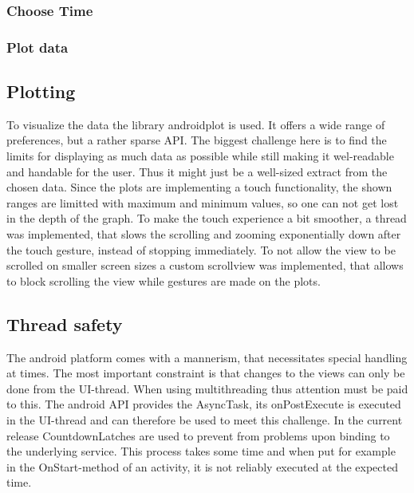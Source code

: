 \documentclass[11pt,oneside,a4paper]{scrartcl}
\begin{document}
\subsubsection{Choose Time}

\subsubsection{Plot data}
\subsection{Plotting}
To visualize the data the library androidplot is used. It offers a wide range of preferences, but a rather sparse API. The biggest challenge here is to find the limits for displaying as much data as possible while still making it wel-readable and handable for the user. Thus it might just be a well-sized extract from the chosen data.
Since the plots are implementing a touch functionality, the shown ranges are limitted with maximum and minimum values, so one can not get lost in the depth of the graph. 
To make the touch experience a bit smoother, a thread was implemented, that slows the scrolling and zooming exponentially down after the touch gesture, instead of stopping immediately.
To not allow the view to be scrolled on smaller screen sizes a custom scrollview was implemented, that allows to block scrolling the view while gestures are made on the plots.

\subsection{Thread safety}
The android platform comes with a mannerism, that necessitates special handling at times. The most important constraint is that changes to the views can only be done from the UI-thread. When using multithreading thus attention must be paid to this. The android API provides the AsyncTask, its onPostExecute is executed in the UI-thread and can therefore be used to meet this challenge.
In the current release CountdownLatches are used to prevent from problems upon binding to the underlying service. This process takes some time and when put for example in the OnStart-method of an activity, it is not reliably executed at the expected time.
\end{document}
